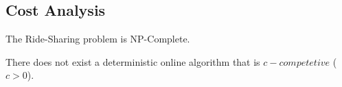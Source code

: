  

\subsection{Cost Analysis}

\begin{theorem}
The Ride-Sharing problem is NP-Complete.
\end{theorem}

\begin{theorem}
There does not exist a deterministic online algorithm that is $c-competetive$ ($c > 0$). 
\end{theorem}



